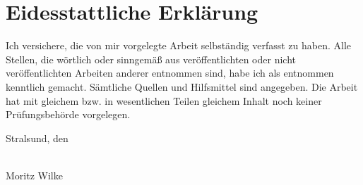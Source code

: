\newpage
\section*{Eidesstattliche Erklärung}
Ich versichere, die von mir vorgelegte Arbeit selbständig verfasst zu haben. Alle Stellen, die wörtlich oder sinngemäß aus veröffentlichten oder nicht veröffentlichten Arbeiten anderer entnommen sind, habe ich als entnommen kenntlich gemacht. Sämtliche Quellen und Hilfsmittel sind angegeben. Die Arbeit hat mit gleichem bzw. in wesentlichen Teilen gleichem Inhalt noch keiner Prüfungsbehörde vorgelegen.

\vspace{1.5cm}
\begin{flushleft}
\begin{minipage}{0.45\linewidth}
  Stralsund, den ~\hrulefill
\end{minipage}
\hfill
\vspace{0.75cm}
\begin{minipage}{0.45\linewidth}
  \vphantom{Stralsund, den}\hrulefill \\
  Moritz Wilke
\end{minipage}
\end{flushleft}
